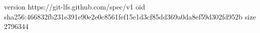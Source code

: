 version https://git-lfs.github.com/spec/v1
oid sha256:466832fb231e391e90e2e0c8561fef15e1d3cf85dd369a0da8ef59d302fd952b
size 2796344
